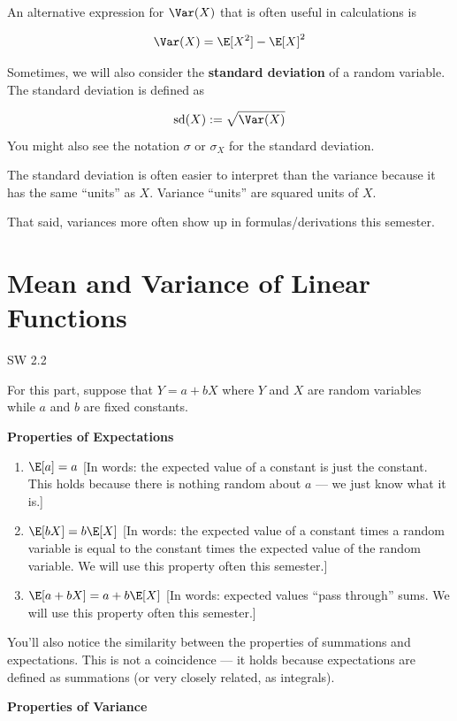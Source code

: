 \documentclass[
  letterpaper,
  DIV=11,
  numbers=noendperiod]{scrreprt}
\begin{document}
An alternative expression for \(\Var(X)\) that is often useful in
calculations is

\[
  \Var(X) = \E[X^2] - \E[X]^2
\]

Sometimes, we will also consider the \textbf{standard deviation} of a
random variable. The standard deviation is defined as

\[
  \textrm{sd}(X) := \sqrt{\Var(X)}
\] You might also see the notation \(\sigma\) or \(\sigma_X\) for the
standard deviation.

The standard deviation is often easier to interpret than the variance
because it has the same ``units'' as \(X\). Variance ``units'' are
squared units of \(X\).

That said, variances more often show up in formulas/derivations this
semester.

\section{Mean and Variance of Linear
Functions}\label{mean-and-variance-of-linear-functions}

SW 2.2

For this part, suppose that \(Y=a + bX\) where \(Y\) and \(X\) are
random variables while \(a\) and \(b\) are fixed constants.

\textbf{Properties of Expectations}

\begin{enumerate}
\def\labelenumi{\arabic{enumi}.}
\item
  \(\E[a] = a\) {[}In words: the expected value of a constant is just
  the constant. This holds because there is nothing random about \(a\)
  --- we just know what it is.{]}
\item
  \(\E[bX] = b\E[X]\) {[}In words: the expected value of a constant
  times a random variable is equal to the constant times the expected
  value of the random variable. We will use this property often this
  semester.{]}
\item
  \(\E[a + bX] = a + b\E[X]\) {[}In words: expected values ``pass
  through'' sums. We will use this property often this semester.{]}
\end{enumerate}

You'll also notice the similarity between the properties of summations
and expectations. This is not a coincidence --- it holds because
expectations are defined as summations (or very closely related, as
integrals).

\textbf{Properties of Variance}
\end{document}
